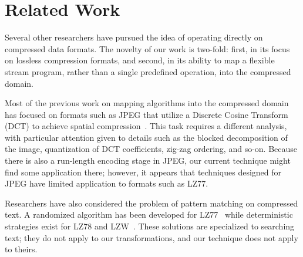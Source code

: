 \section{Related Work}
\label{sec:related}

Several other researchers have pursued the idea of operating directly
on compressed data formats.  The novelty of our work is two-fold:
first, in its focus on lossless compression formats, and second, in
its ability to map a flexible stream program, rather than a single
predefined operation, into the compressed domain.

Most of the previous work on mapping algorithms into the compressed
domain has focused on formats such as JPEG that utilize a Discrete
Cosine Transform (DCT) to achieve spatial
compression~\cite{smith98,dorai00,dugad01,feng03,mukherjee02,nang00,shen96,shen96b,shen98,smith96b,vasudev98}.
This task requires a different analysis, with particular attention
given to details such as the blocked decomposition of the image,
quantization of DCT coefficients, zig-zag ordering, and so-on.
Because there is also a run-length encoding stage in JPEG, our current
technique might find some application there; however, it appears that
techniques designed for JPEG have limited application to formats such
as LZ77.  


Researchers have also considered the problem of pattern matching on
compressed text.  A randomized algorithm has been developed for
LZ77~\cite{farach98matching} while deterministic strategies exist for
LZ78 and LZW~\cite{navarro03regular,navarro05lzgrep}.  These solutions
are specialized to searching text; they do not apply to our
transformations, and our technique does not apply to theirs.

